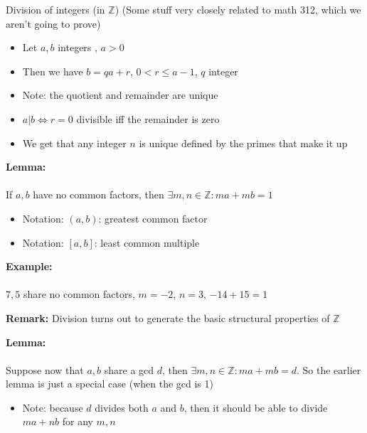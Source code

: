 \documentclass{article}
\newcommand{\Z}{\mathbb{Z}}
\begin{document}
Division of integers (in $\Z$) (Some stuff very closely related to math 312, which we aren't going to prove)
\begin{itemize}
	\item Let $a,b$ integers , $a>0$
	\item Then we have $b= qa+r$, $0 <r\le a-1$, $q$ integer
	\item Note: the quotient and remainder are unique
	\item $a|b \iff r=0$ divisible iff the remainder is zero 
	\item We get that any integer $n$ is unique defined by the primes that make it up
\end{itemize}
\begin{lemma} 
\textbf{Lemma:} \\
~\\
If $a,b$ have no common factors, then $\exists m,n \in\Z : ma+mb=1$
\begin{itemize}
	\item Notation: $(a,b)$: greatest common factor
	\item Notation: $\left[a,b\right]$: least common multiple
\end{itemize}
\end{lemma}
\begin{example} 
\textbf{Example:}  \\
~\\
$7,5$ share no common factors, $m=-2$, $n=3$, $-14 + 15 = 1$
\end{example}
\begin{remark} 
\textbf{Remark:}  Division turns out to generate the basic structural properties of $\Z$
\end{remark}
\begin{lemma} 
\textbf{Lemma:} \\
~\\
Suppose now that $a,b$ share a gcd $d$, then $\exists m,n\in\Z: ma+mb=d$. So the earlier lemma is just a special case (when the gcd is 1)
\begin{itemize}
	\item Note: because $d$ divides both $a$ and $b$, then it should be able to divide $ma+nb$ for any $m,n$
\end{itemize}
\end{lemma}
\end{document}
